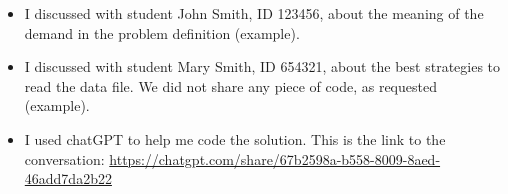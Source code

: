 \documentclass[a4paper,12pt]{article}
\begin{document}
\begin{itemize}
    \item I discussed with student John Smith, ID 123456, about the meaning of the demand in the problem definition (example).
    \item I discussed with student Mary Smith, ID 654321, about the best strategies to read the data file. We did not share any piece of code, as requested (example).
\end{itemize}


\begin{itemize}
    \item I used chatGPT to help me code the solution. This is the link to the conversation: \href{https://chatgpt.com/share/67b2598a-b558-8009-8aed-46add7da2b22}{https://chatgpt.com/share/67b2598a-b558-8009-8aed-46add7da2b22}
\end{itemize}
\end{document}
